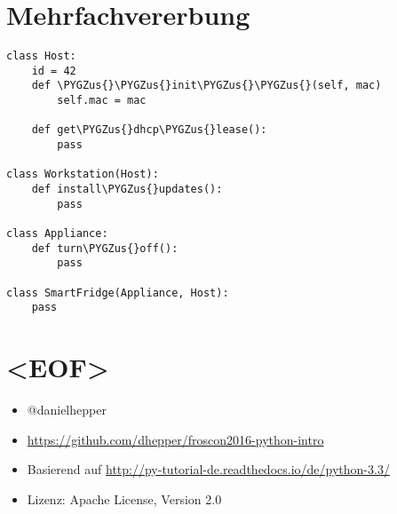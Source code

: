 \documentclass[letterpaper,10pt,ngerman]{sphinxmanual}
\def\PYGZus{\char`\_}
\begin{document}
\chapter{Mehrfachvererbung}
\label{index:mehrfachvererbung}
\begin{Verbatim}[commandchars=\\\{\}]
class Host:
    id = 42
    def \PYGZus{}\PYGZus{}init\PYGZus{}\PYGZus{}(self, mac)
        self.mac = mac

    def get\PYGZus{}dhcp\PYGZus{}lease():
        pass

class Workstation(Host):
    def install\PYGZus{}updates():
        pass

class Appliance:
    def turn\PYGZus{}off():
        pass

class SmartFridge(Appliance, Host):
    pass
\end{Verbatim}


\chapter{\textless{}EOF\textgreater{}}
\label{index:eof}\begin{itemize}
\item {} 
@danielhepper

\item {} 
\href{https://github.com/dhepper/froscon2016-python-intro}{https://github.com/dhepper/froscon2016-python-intro}

\item {} 
Basierend auf \href{http://py-tutorial-de.readthedocs.io/de/python-3.3/}{http://py-tutorial-de.readthedocs.io/de/python-3.3/}

\item {} 
Lizenz: Apache License, Version 2.0

\end{itemize}



\renewcommand{\indexname}{Stichwortverzeichnis}
\printindex
\end{document}
